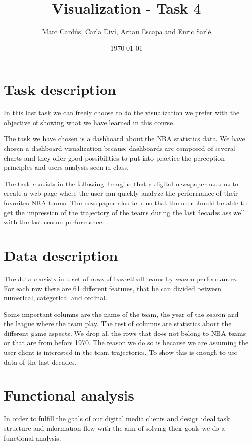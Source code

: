 \documentclass[11pt, a4paper]{article}
\author{Marc Cardús, Carla Diví, Arnau Escapa and Enric Sarlé}
\date{\today}
\title{Visualization - Task 4}
\begin{document}
\maketitle
\section{Task description}

In this last task we can freely choose to do the visualization we prefer with the objective of showing what we have learned in this course.

\medskip
The task we have chosen is a dashboard about the NBA statistics data. We have chosen a dashboard visualization because dashboards are composed of several charts and they offer good possibilities to put into practice  the perception principles and users analysis seen in class.

\medskip
The task consists in the following. Imagine that a digital newspaper asks us to create a web page where the user can quickly analyze the performance of their favorites NBA teams. The newspaper also tells us that the user should be able to get the impression of the trajectory of the teams during the last decades ass well with the last season performance.   

\section{Data description}
The data consists in a set of rows of basketball teams by season performances.  For each row there are 61 different features, that be can divided between numerical, categorical and ordinal.

\medskip
Some important columns are the name of the team, the year of the season and the league where the team play. The rest of columns are statistics about the different game aspects. We drop all the rows that does not belong to NBA teams or that are from before 1970. The reason we do so is because we are assuming the user  client is interested in the team trajectories. To show this is enough to use data of the last decades. 



\section{Functional analysis}
In order to fulfill the goals of our digital media clients  and design ideal task structure and information flow with the aim of solving their goals we do a functional analysis.
\end{document}
